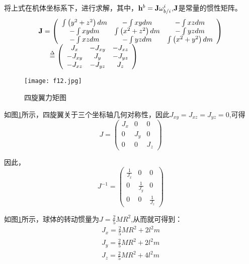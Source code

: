 将上式在机体坐标系下，进行求解，其中，${{\bf{h}}^b} = {\bf{J}}\omega _{b/i}^i$,${\bf{J}}$是常量的惯性矩阵。
\[\begin{array}{l}
{\bf{J}} = \left( {\begin{array}{*{20}{c}}
{\int {\left( {{y^2} + {z^2}} \right)dm} }&{ - \int {xydm} }&{ - \int {xzdm} }\\
{ - \int {xydm} }&{\int {\left( {{x^2} + {z^2}} \right)dm} }&{ - \int {yzdm} }\\
{ - \int {xzdm} }&{ - \int {yzdm} }&{\int {\left( {{x^2} + {y^2}} \right)dm} }
\end{array}} \right)\\
{\kern 1pt} {\kern 1pt} {\kern 1pt} {\kern 1pt} {\kern 1pt} {\kern 1pt} {\kern 1pt} {\kern 1pt} {\kern 1pt} {\kern 1pt} {\kern 1pt} {\kern 1pt} {\kern 1pt}  \buildrel \Delta \over = \left( {\begin{array}{*{20}{c}}
{{J_x}}&{ - {J_{xy}}}&{ - {J_{xz}}}\\
{ - {J_{xy}}}&{{J_y}}&{ - {J_{yz}}}\\
{ - {J_{xz}}}&{ - {J_{yz}}}&{{J_z}}
\end{array}} \right)
\end{array}\]
\vspace{-10pt}
\begin{figure}[!ht]
\centering
\texttt{[image: f12.jpg]}
\caption{四旋翼力矩图}
\label{fig20}
\end{figure}
如图\ref{fig20}所示，四旋翼关于三个坐标轴几何对称性，因此${J_{xy}} = {J_{xz}} = {J_{yz}} = 0$,可得
\[J = \left( {\begin{array}{*{20}{c}}
{{J_x}}&0&0\\
0&{{J_y}}&0\\
0&0&{{J_z}}
\end{array}} \right)\]

因此，
\[{J^{ - 1}} = \left( {\begin{array}{*{20}{c}}
{\frac{1}{{{J_x}}}}&0&0\\
0&{\frac{1}{{{J_y}}}}&0\\
0&0&{\frac{1}{{{J_z}}}}
\end{array}} \right)\]

如图\ref{fig20}所示，球体的转动惯量为$J = \frac{2}{5}M{R^2}$,从而就可得到：
\[\begin{array}{l}
{J_x} = \frac{2}{5}M{R^2} + 2{l^2}m\\
{J_y} = \frac{2}{5}M{R^2} + 2{l^2}m\\
{J_z} = \frac{2}{5}M{R^2} + 4{l^2}m
\end{array}\]

